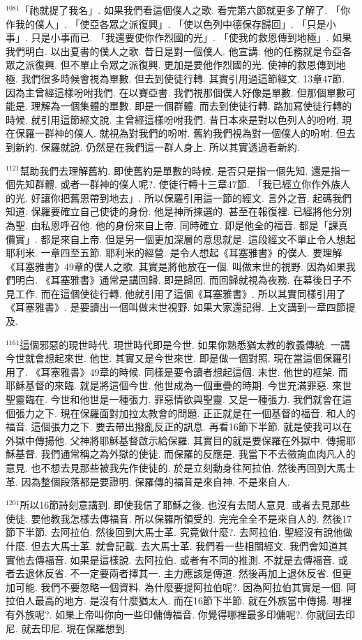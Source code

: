\documentclass{book}
\begin{document}
$^{1081}$「祂就提了我名」.
如果我們看這個僕人之歌.
看完第六節就更多了解了.
「你作我的僕人」.
「使亞各眾之派復興」.
「使以色列中德保存歸回」.
「只是小事」.
只是小事而已.
「我還要使你作烈國的光」.
「使我的救恩傳到地極」.
如果我們明白.
以出夏書的僕人之歌.
昔日是對一個僕人.
他宣講.
他的任務就是令亞各眾之派復興.
但不單止令眾之派復興.
更加是要他作烈國的光.
使神的救恩傳到地極.
我們很多時候會視為單數.
但去到使徒行轉.
其實引用過這節經文.
13章47節.
因為主曾經這樣吩咐我們.
在以賽亞書.
我們視那個僕人好像是單數.
但那個單數可能是.
理解為一個集體的單數.
即是一個群體.
而去到使徒行轉.
路加寫使徒行轉的時候.
就引用這節經文說.
主曾經這樣吩咐我們.
昔日本來是對以色列人的吩咐.
現在保羅一群神的僕人.
就視為對我們的吩咐.
舊約我們視為對一個僕人的吩咐.
但去到新約.
保羅就說.
仍然是在我們這一群人身上.
所以其實透過看新約.

$^{1121}$幫助我們去理解舊約.
即使舊約是單數的時候.
是否只是指一個先知.
還是指一個先知群體.
或者一群神的僕人呢?.
使徒行轉十三章47節.
「我已經立你作外族人的光.
好讓你把舊恩帶到地去」.
所以保羅引用這一節的經文.
言外之音.
起碼我們知道.
保羅要確立自己使徒的身份.
他是神所揀選的.
甚至在報復裡.
已經將他分別為聖.
由私恩呼召他.
他的身份來自上帝.
同時確立.
即是他全的福音.
都是「課真價實」.
都是來自上帝.
但是另一個更加深層的意思就是.
這段經文不單止令人想起耶利米.
一章四至五節.
耶利米的經營.
是令人想起《耳塞雅書》的僕人.
要理解《耳塞雅書》49章的僕人之歌.
其實是將他放在一個.
叫做末世的視野.
因為如果我們明白.
《耳塞雅書》通常是講回歸.
即是歸回.
而回歸就視為夜務.
在幕後日子不見工作.
而在這個使徒行轉.
他就引用了這個《耳塞雅書》.
所以其實同樣引用了《耳塞雅書》.
是要讀出一個叫做末世視野.
如果大家還記得.
上文講到一章四節提及.

$^{1161}$這個邪惡的現世時代.
現世時代即是今世.
如果你熟悉猶太教的教義傳統.
一講今世就會想起來世.
他世.
其實又是今世來世.
即是做一個對照.
現在當這個保羅引用了.
《耳塞雅書》49章的時候.
同樣是要令讀者想起這個.
末世.
他世的框架.
而耶穌基督的來臨.
就是將這個今世.
他世成為一個重疊的時期.
今世充滿罪惡.
來世聖靈臨在.
今世和他世是一種張力.
罪惡情欲與聖靈.
又是一種張力.
我們就會在這個張力之下.
現在保羅面對加拉太教會的問題.
正正就是在一個基督的福音.
和人的福音.
這個張力之下.
要去帶出撥亂反正的訊息.
再看16節下半節.
就是使我可以在外獄中傳揚他.
父神將耶穌基督啟示給保羅.
其實目的就是要保羅在外獄中.
傳揚耶穌基督.
我們通常稱之為外獄的使徒.
而保羅的反應是.
我當下不去徵詢血肉凡人的意見.
也不想去見那些被我先作使徒的.
於是立刻動身往阿拉伯.
然後再回到大馬士革.
因為整個段落都是要證明.
保羅傳的福音是來自神.
不是來自人.

$^{1201}$所以16節詩刻意講到.
即使我信了耶穌之後.
也沒有去問人意見.
或者去見那些使徒.
要他教我怎樣去傳福音.
所以保羅所領受的.
完完全全不是來自人的.
然後17節下半節.
去阿拉伯.
然後回到大馬士革.
究竟做什麼?.
去阿拉伯.
聖經沒有說他做什麼.
但去大馬士革.
就會記載.
去大馬士革.
我們看一些相關經文.
我們會知道其實他去傳福音.
如果是這樣說.
去阿拉伯.
或者有不同的推測.
不就是去傳福音.
或者去退休反省.
不一定要兩者擇其一.
主力應該是傳道.
然後再加上退休反省.
但更加可能.
我們不要忽略一個資料.
為什麼要提阿拉伯呢?.
因為阿拉伯其實是一個.
阿拉伯人最高的地方.
是沒有什麼猶太人.
而在16節下半節.
就在外族當中傳揚.
哪裡有外族呢?.
如果上帝叫你向一些印傭傳福音.
你覺得哪裡最多印傭呢?.
你就回去印尼.
就去印尼.
現在保羅想到.
\end{document}
